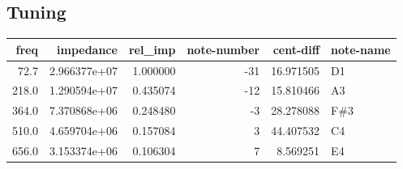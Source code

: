 \documentclass{article}
\begin{document}
\subsection{Tuning}
\begin{centering}
\begin{tabular}{rrrrrl}
\toprule
 freq &    impedance &  rel\_imp &  note-number &  cent-diff & note-name \\
\midrule
 72.7 & 2.966377e+07 & 1.000000 &          -31 &  16.971505 &        D1 \\
218.0 & 1.290594e+07 & 0.435074 &          -12 &  15.810466 &        A3 \\
364.0 & 7.370868e+06 & 0.248480 &           -3 &  28.278088 &       F\#3 \\
510.0 & 4.659704e+06 & 0.157084 &            3 &  44.407532 &        C4 \\
656.0 & 3.153374e+06 & 0.106304 &            7 &   8.569251 &        E4 \\
\bottomrule
\end{tabular}
\end{centering}
\end{document}
